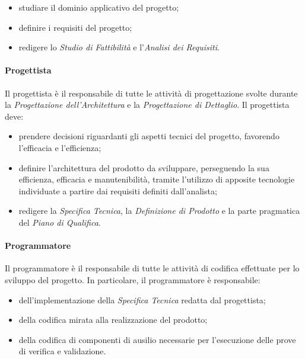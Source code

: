 			\begin{itemize}
				\item studiare il dominio applicativo del progetto;
				\item definire i requisiti del progetto;
				\item redigere lo \textit{Studio di Fattibilità} e l'\textit{Analisi dei Requisiti}.
			\end{itemize}
		
		\paragraph{Progettista}
		
			Il progettista è il responsabile di tutte le attività di progettazione svolte durante la \textit{Progettazione dell'Architettura} e la \textit{Progettazione di Dettaglio}.\newline
			Il progettista deve:
			
			\begin{itemize}
				\item prendere decisioni riguardanti gli aspetti tecnici del progetto, favorendo l'efficacia e l'efficienza;
				\item definire l'architettura del prodotto da sviluppare, perseguendo la sua efficienza, efficacia e manutenibilità, tramite l'utilizzo di apposite tecnologie individuate a partire dai requisiti definiti dall'analista;
				\item redigere la \textit{Specifica Tecnica}, la \textit{Definizione di Prodotto} e la parte pragmatica del \textit{Piano di Qualifica}.
			\end{itemize}
		
		\paragraph{Programmatore}
		
			Il programmatore è il responsabile di tutte le attività di codifica effettuate per lo sviluppo del progetto.\newline
			In particolare, il programmatore è responsabile:
			
			\begin{itemize}
				\item dell'implementazione della \textit{Specifica Tecnica} redatta dal progettista;
				\item della codifica mirata alla realizzazione del prodotto;
				\item della codifica di componenti di ausilio necessarie per l'esecuzione delle prove di verifica e validazione.
			\end{itemize}
		
